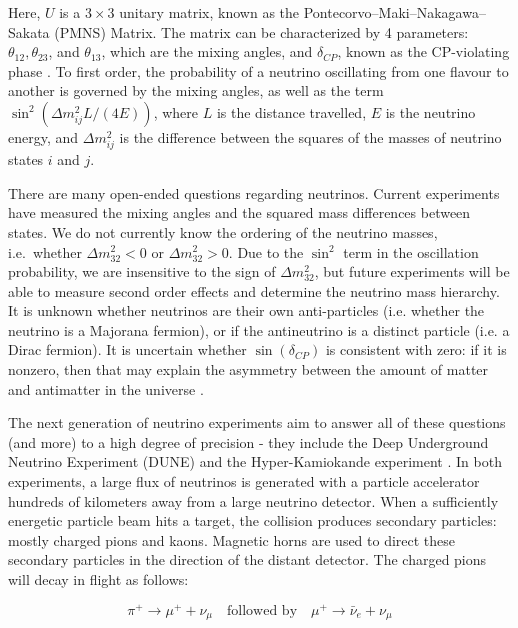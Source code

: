 Here, $U$ is a $3 \times 3$ unitary matrix, known as the Pontecorvo–Maki–Nakagawa–Sakata (PMNS) Matrix. The matrix can be characterized by 4 parameters: $\theta_{12}, \theta_{23}$, and $\theta_{13}$, which are the mixing angles, and $\delta_{CP}$, known as the CP-violating phase \cite{pdg2018}. To first order, the probability of a neutrino oscillating from one flavour to another is governed by the mixing angles, as well as the term $\sin^2(\Delta m_{ij}^2 L/(4E))$, where $L$ is the distance travelled, $E$ is the neutrino energy, and $\Delta m_{ij}^2$ is the difference between the squares of the masses of neutrino states $i$ and $j$.

There are many open-ended questions regarding neutrinos.
Current experiments have measured the mixing angles and the squared mass differences between states.
We do not currently know the ordering of the neutrino masses,  i.e.\ whether $\Delta m_{32}^2  < 0$ or $\Delta m_{32}^2 > 0$.
Due to the $\sin^2$ term in the oscillation probability, we are insensitive to the sign of $\Delta m_{32}^2$,
but future experiments will be able to measure second order effects and determine the neutrino mass hierarchy.
It is unknown whether neutrinos are their own anti-particles (i.e. whether the neutrino is a Majorana fermion), or if the antineutrino is a distinct particle (i.e. a Dirac fermion).
It is uncertain whether $\sin(\delta_{CP})$ is consistent with zero: if it is nonzero, then that may explain the asymmetry between the amount of matter and antimatter in the universe \cite{neutrinoCP}.

The next generation of neutrino experiments aim to answer all of these questions (and more) to a high degree of precision - they include the Deep Underground Neutrino Experiment (DUNE) \cite{duneDesign} and the Hyper-Kamiokande experiment \cite{hyperKDesign}.
In both experiments, a large flux of neutrinos is generated with a particle accelerator hundreds of kilometers away from a large neutrino detector.
When a sufficiently energetic particle beam hits a target, the collision produces secondary particles: mostly charged pions and kaons.
Magnetic horns are used to direct these secondary particles in the direction of the distant detector.
The charged pions will decay in flight as follows:

\begin{equation}
\pi^+ \rightarrow \mu^+ + \nu_\mu \quad   \text{followed by} \quad \mu^+ \rightarrow \bar{\nu}_e + \nu_\mu
\end{equation}

